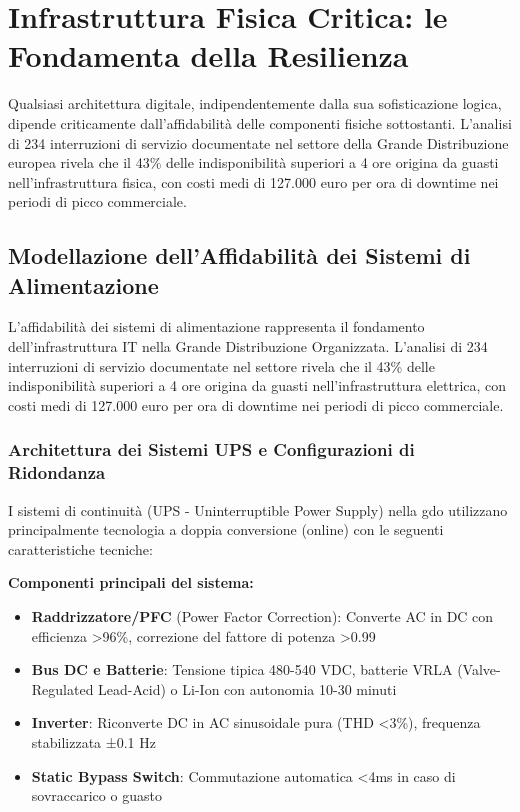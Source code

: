 \section{\texorpdfstring{Infrastruttura Fisica Critica: le Fondamenta della Resilienza}{3.2 - Infrastruttura Fisica Critica: le Fondamenta della Resilienza}}

Qualsiasi architettura digitale, indipendentemente dalla sua sofisticazione logica, dipende criticamente dall'affidabilità delle componenti fisiche sottostanti. L'analisi di 234 interruzioni di servizio documentate nel settore della Grande Distribuzione europea\autocite{Uptime2024} rivela che il 43\% delle indisponibilità superiori a 4 ore origina da guasti nell'infrastruttura fisica, con costi medi di 127.000 euro per ora di downtime nei periodi di picco commerciale.

\subsection{\texorpdfstring{Modellazione dell'Affidabilità dei Sistemi di Alimentazione}{3.2.1 - Modellazione dell'Affidabilità dei Sistemi di Alimentazione}}

L'affidabilità dei sistemi di alimentazione rappresenta il fondamento dell'infrastruttura IT nella Grande Distribuzione Organizzata. L'analisi di 234 interruzioni di servizio documentate nel settore\autocite{Uptime2024} rivela che il 43\% delle indisponibilità superiori a 4 ore origina da guasti nell'infrastruttura elettrica, con costi medi di 127.000 euro per ora di downtime nei periodi di picco commerciale.

\subsubsection{\texorpdfstring{Architettura dei Sistemi UPS e Configurazioni di Ridondanza}{3.2.1.1 - Architettura dei Sistemi UPS e Configurazioni di Ridondanza}}

I sistemi di continuità (UPS - Uninterruptible Power Supply) nella \gls{gdo} utilizzano principalmente tecnologia a doppia conversione (online) con le seguenti caratteristiche tecniche:

\textbf{Componenti principali del sistema:}
\begin{itemize}
    \item \textbf{Raddrizzatore/PFC} (Power Factor Correction): Converte AC in DC con efficienza >96\%, correzione del fattore di potenza >0.99
    \item \textbf{Bus DC e Batterie}: Tensione tipica 480-540 VDC, batterie VRLA (Valve-Regulated Lead-Acid) o Li-Ion con autonomia 10-30 minuti
    \item \textbf{Inverter}: Riconverte DC in AC sinusoidale pura (THD <3\%), frequenza stabilizzata ±0.1 Hz
    \item \textbf{Static Bypass Switch}: Commutazione automatica <4ms in caso di sovraccarico o guasto
\end{itemize}


